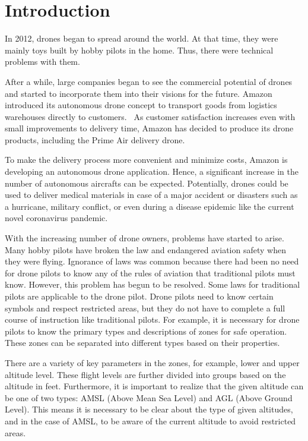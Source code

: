 \chapter{Introduction}\label{ch:introduction}
In 2012, drones began to spread around the world.
At that time, they were mainly toys built by hobby pilots in the home.
Thus, there were technical problems with them.

After a while, large companies began to see the commercial potential of drones and started to incorporate them into their visions for the future.
Amazon introduced its autonomous drone concept to transport goods from logistics warehouses directly to customers.~\cite{amazonArticle}
As customer satisfaction increases even with small improvements to delivery time, Amazon has decided to produce its drone products, including the Prime Air delivery drone.

To make the delivery process more convenient and minimize costs, Amazon is developing an autonomous drone application.
Hence, a significant increase in the number of autonomous aircrafts can be expected.
Potentially, drones could be used to deliver medical materials in case of a major accident or disasters such as a hurricane, military conflict, or even during a disease epidemic like the current novel coronavirus pandemic.

With the increasing number of drone owners, problems have started to arise.
Many hobby pilots have broken the law and endangered aviation safety when they were flying.
Ignorance of laws was common because there had been no need for drone pilots to know any of the rules of aviation that traditional pilots must know.
However, this problem has begun to be resolved.
Some laws for traditional pilots are applicable to the drone pilot.
Drone pilots need to know certain symbols and respect restricted areas, but they do not have to complete a full course of instruction like traditional pilots.
For example, it is necessary for drone pilots to know the primary types and descriptions of zones for safe operation.
These zones can be separated into different types based on their properties.

There are a variety of key parameters in the zones, for example, lower and upper altitude level.
These flight levels are further divided into groups based on the altitude in feet.
Furthermore, it is important to realize that the given altitude can be one of two types: AMSL (Above Mean Sea Level) and AGL (Above Ground Level).
This means it is necessary to be clear about the type of given altitudes, and in the case of AMSL, to be aware of the current altitude to avoid restricted areas.


